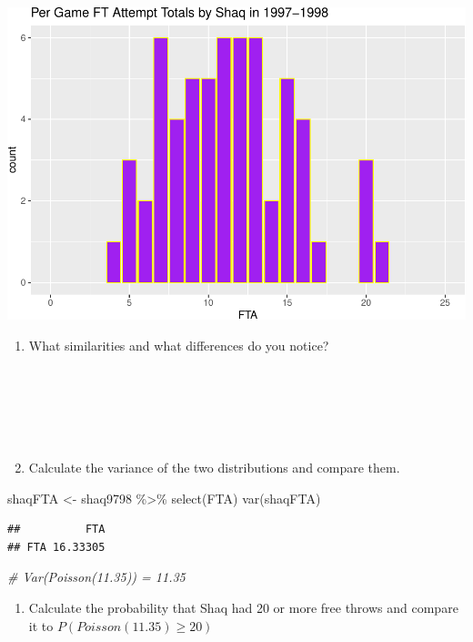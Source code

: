 \documentclass[
  11pt,
]{book}
\newenvironment{Shaded}{\begin{snugshade}}{\end{snugshade}}
\newcommand{\CommentTok}[1]{\textcolor[rgb]{0.56,0.35,0.01}{\textit{#1}}}
\newcommand{\FunctionTok}[1]{\textcolor[rgb]{0.00,0.00,0.00}{#1}}
\newcommand{\NormalTok}[1]{#1}
\newcommand{\OtherTok}[1]{\textcolor[rgb]{0.56,0.35,0.01}{#1}}
\newcommand{\SpecialCharTok}[1]{\textcolor[rgb]{0.00,0.00,0.00}{#1}}
\providecommand{\tightlist}{%
  \setlength{\itemsep}{0pt}\setlength{\parskip}{0pt}}
\theoremstyle{definition}
\theoremstyle{definition}
\theoremstyle{definition}
\theoremstyle{definition}
\theoremstyle{remark}
\begin{document}
\includegraphics{series_files/figure-latex/unnamed-chunk-55-1.pdf}

\begin{enumerate}
\def\labelenumi{(\alph{enumi})}
\setcounter{enumi}{2}
\item
  What similarities and what differences do you notice?\\
  \strut \\
  \strut \\
  \strut \\
\item
  Calculate the variance of the two distributions and compare them.
\end{enumerate}

\begin{Shaded}
\begin{Highlighting}[]
\NormalTok{shaqFTA }\OtherTok{\textless{}{-}}\NormalTok{ shaq9798 }\SpecialCharTok{\%\textgreater{}\%}
    \FunctionTok{select}\NormalTok{(FTA)}
\FunctionTok{var}\NormalTok{(shaqFTA)}
\end{Highlighting}
\end{Shaded}

\begin{verbatim}
##          FTA
## FTA 16.33305
\end{verbatim}

\begin{Shaded}
\begin{Highlighting}[]
\CommentTok{\# Var(Poisson(11.35)) = 11.35}
\end{Highlighting}
\end{Shaded}

\begin{enumerate}
\def\labelenumi{(\alph{enumi})}
\setcounter{enumi}{4}
\tightlist
\item
  Calculate the probability that Shaq had 20 or more free throws and compare it to \(P(Poisson(11.35) \geq 20)\)
\end{enumerate}
\end{document}
